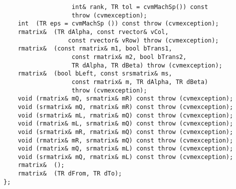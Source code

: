 \verb"                   int& rank, TR tol = cvmMachSp()) const"\\
\verb"                   throw (cvmexception);"\\
\verb"    int "\verb" (TR eps = cvmMachSp ()) const throw (cvmexception);"\\
\verb"    rmatrix& "\verb" (TR dAlpha, const rvector& vCol,"\\
\verb"                  const rvector& vRow) throw (cvmexception);"\\
\verb"    rmatrix& "\verb" (const rmatrix& m1, bool bTrans1,"\\
\verb"                   const rmatrix& m2, bool bTrans2,"\\
\verb"                   TR dAlpha, TR dBeta) throw (cvmexception);"\\
\verb"    rmatrix& "\verb" (bool bLeft, const srsmatrix& ms, "\\
\verb"                   const rmatrix& m, TR dAlpha, TR dBeta)"\\
\verb"                   throw (cvmexception);"\\
\verb"    void "\verb"(rmatrix& mQ, srmatrix& mR) const throw (cvmexception);"\\
\verb"    void "\verb"(srmatrix& mQ, rmatrix& mR) const throw (cvmexception);"\\
\verb"    void "\verb"(srmatrix& mL, rmatrix& mQ) const throw (cvmexception);"\\
\verb"    void "\verb"(rmatrix& mL, srmatrix& mQ) const throw (cvmexception);"\\
\verb"    void "\verb"(srmatrix& mR, rmatrix& mQ) const throw (cvmexception);"\\
\verb"    void "\verb"(rmatrix& mR, srmatrix& mQ) const throw (cvmexception);"\\
\verb"    void "\verb"(rmatrix& mQ, srmatrix& mL) const throw (cvmexception);"\\
\verb"    void "\verb"(srmatrix& mQ, rmatrix& mL) const throw (cvmexception);"\\
\verb"    rmatrix& "\verb" ();"\\
\verb"    rmatrix& "\verb" (TR dFrom, TR dTo);"\\
\verb"};"
\newpage


